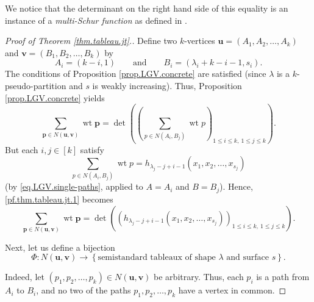 \documentclass[reqno]{amsart}%
\newcommand{\0}{\phantom{c}}
\let\sumnonlimits\sum
\renewcommand{\sum}{\sumnonlimits\limits}
\theoremstyle{plain}
\theoremstyle{definition}
\numberwithin{equation}{section}
\begin{document}
We notice that the determinant on the right hand side of this equality is an
instance of a \textit{multi-Schur function} as defined in \cite[(SCHUR.2.2)]%
{LLPT18}.

\begin{proof}
[Proof of Theorem \ref{thm.tableau.jt}.]Define two $k$-vertices $\mathbf{u}%
=\left(  A_{1},A_{2},\ldots,A_{k}\right)  $ and $\mathbf{v}=\left(
B_{1},B_{2},\ldots,B_{k}\right)  $ by%
\[
A_{i}=\left(  k-i,1\right)  \qquad\text{and}\qquad B_{i}=\left(  \lambda
_{i}+k-i-1,s_{i}\right)  .
\]
The conditions of Proposition \ref{prop.LGV.concrete} are satisfied (since
$\lambda$ is a $k$-pseudo-partition and $s$ is weakly increasing). Thus,
Proposition \ref{prop.LGV.concrete} yields%
\begin{equation}
\sum_{\mathbf{p}\in N\left(  \mathbf{u},\mathbf{v}\right)  }\operatorname*{wt}%
\mathbf{p}=\det\left(  \left(  \sum_{p\in N\left(  A_{i},B_{j}\right)
}\operatorname*{wt}p\right)  _{1\leq i\leq k,\ 1\leq j\leq k}\right)  .
\label{pf.thm.tableau.jt.1}%
\end{equation}
But each $i,j\in\left[  k\right]  $ satisfy%
\begin{equation}
\sum_{p\in N\left(  A_{i},B_{j}\right)  }\operatorname*{wt}p=h_{\lambda
_{j}-j+i-1}\left(  x_{1},x_{2},\ldots,x_{s_{j}}\right)
\label{pf.thm.tableau.jt.2}%
\end{equation}
(by \eqref{eq.LGV.single-paths}, applied to $A=A_{i}$ and $B=B_{j}$). Hence,
\eqref{pf.thm.tableau.jt.1} becomes%
\begin{equation}
\sum_{\mathbf{p}\in N\left(  \mathbf{u},\mathbf{v}\right)  }\operatorname*{wt}%
\mathbf{p}=\det\left(  \left(  h_{\lambda_{j}-j+i-1}\left(  x_{1},x_{2}%
,\ldots,x_{s_{j}}\right)  \right)  _{1\leq i\leq k,\ 1\leq j\leq k}\right)  .
\label{pf.thm.tableau.jt.3}%
\end{equation}


Next, let us define a bijection%
\[
\Phi:N\left(  \mathbf{u},\mathbf{v}\right)  \rightarrow\left\{
\text{semistandard tableaux of shape }\lambda\text{ and surface }s\right\}  .
\]


Indeed, let $\left(  p_{1},p_{2},\ldots,p_{k}\right)  \in N\left(
\mathbf{u},\mathbf{v}\right)  $ be arbitrary. Thus, each $p_{i}$ is a path
from $A_{i}$ to $B_{i}$, and no two of the paths $p_{1},p_{2},\ldots,p_{k}$
have a vertex in common.


\end{proof}
\end{document}
